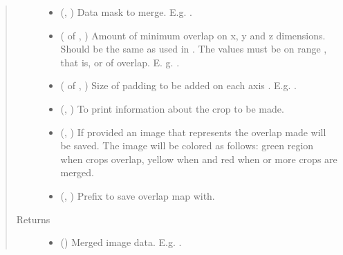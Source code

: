 \documentclass[letterpaper,10pt,english]{sphinxmanual}
\begin{document}
\begin{fulllineitems}
\begin{quote}
\begin{description}
\begin{itemize}
\item {} 
 (, ) \textendash{} Data mask to merge. E.g. .

\item {} 
 ( of , ) \textendash{} Amount of minimum overlap on x, y and z dimensions. Should be the same as used in
{\hyperref[\detokenize{data/data_2d_manipulation:data.data_2D_manipulation.crop_data_with_overlap}]{}}. The values must be on range \sphinxcode{\sphinxupquote{{[}0, 1)}}, that is,  or  of
overlap. E. g. .

\item {} 
 ( of , ) \textendash{} Size of padding to be added on each axis . E.g. .

\item {} 
 (, ) \textendash{} To print information about the crop to be made.

\item {} 
 (, ) \textendash{} If provided an image that represents the overlap made will be saved. The image will be colored as follows:
green region when  crops overlap, yellow when  and red when  or more crops are
merged.

\item {} 
 (, ) \textendash{} Prefix to save overlap map with.

\end{itemize}

\item[{Returns}] \leavevmode
\begin{itemize}
\item {} 
 () \textendash{} Merged image data. E.g. .


\end{itemize}
\end{description}
\end{quote}
\end{fulllineitems}
\end{document}
